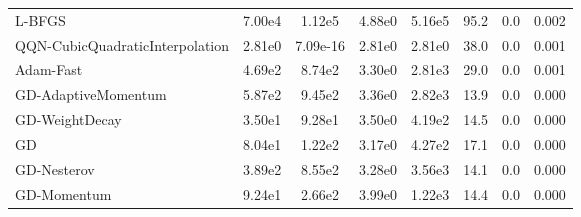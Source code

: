 \documentclass{article}
\begin{document}
\begin{table}[htbp]
{\begin{tabular}{p{2.5cm}*{7}{c}}
L-BFGS & 7.00e4 & 1.12e5 & 4.88e0 & 5.16e5 & 95.2 & 0.0 & 0.002 \\
QQN-CubicQuadraticInterpolation & 2.81e0 & 7.09e-16 & 2.81e0 & 2.81e0 & 38.0 & 0.0 & 0.001 \\
Adam-Fast & 4.69e2 & 8.74e2 & 3.30e0 & 2.81e3 & 29.0 & 0.0 & 0.001 \\
GD-AdaptiveMomentum & 5.87e2 & 9.45e2 & 3.36e0 & 2.82e3 & 13.9 & 0.0 & 0.000 \\
GD-WeightDecay & 3.50e1 & 9.28e1 & 3.50e0 & 4.19e2 & 14.5 & 0.0 & 0.000 \\
GD & 8.04e1 & 1.22e2 & 3.17e0 & 4.27e2 & 17.1 & 0.0 & 0.000 \\
GD-Nesterov & 3.89e2 & 8.55e2 & 3.28e0 & 3.56e3 & 14.1 & 0.0 & 0.000 \\
GD-Momentum & 9.24e1 & 2.66e2 & 3.99e0 & 1.22e3 & 14.4 & 0.0 & 0.000 \\
\bottomrule
\end{tabular}
}
\end{table}
\end{document}
